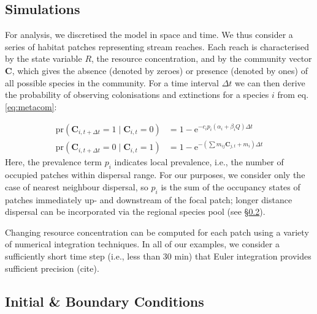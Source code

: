\documentclass[11pt,a4paper]{article}
\begin{document}
\subsection{Simulations}

For analysis, we discretised the model in space and time.
We thus consider a series of habitat patches representing stream reaches.
Each reach is characterised by the state variable $R$, the resource concentration, and by the community vector $\mathbf{C}$, which gives the absence (denoted by zeroes) or presence (denoted by ones) of all possible species in the community.
For a time interval $\Delta t$ we can then derive the probability of observing colonisations and extinctions for a species $i$ from eq. \ref{eq:metacom}:

\begin{equation}
\begin{split}
	\mathrm{pr}\left( \mathbf{C}_{i, t+\Delta t} = 1 \mid \mathbf{C}_{i, t} = 0\right) &= 
			1 - \mathrm{e}^{-c_i p_i(\alpha_i + \beta_iQ) \Delta t} \\
	\mathrm{pr}\left( \mathbf{C}_{i, t+\Delta t} = 0 \mid \mathbf{C}_{i, t} = 1\right) &= 
			1 - \mathrm{e}^{-\left( \sum{m_{ij}\mathbf{C}_{j, t}} + m_i \right)\Delta t}
	\label{eq:ceprob}
\end{split}
\end{equation}
Here, the prevalence term $p_i$ indicates local prevalence, i.e., the number of occupied patches within dispersal range.
For our purposes, we consider only the case of nearest neighbour dispersal, so $p_i$ is the sum of the occupancy states of patches immediately up- and downstream of the focal patch; longer distance dispersal can be incorporated via the regional species pool (see §\ref{ss:initial-boundary}).

Changing resource concentration can be computed for each patch using a variety of numerical integration techniques.
In all of our examples, we consider a sufficiently short time step (i.e., less than 30 min) that Euler integration provides sufficient precision (cite).

\subsection{Initial \& Boundary Conditions} \label{ss:initial-boundary}
\end{document}
